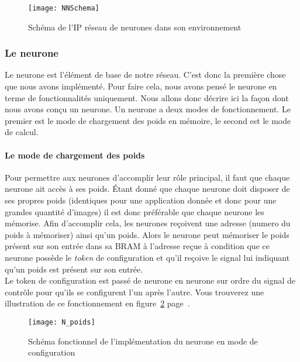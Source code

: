 \begin{figure}[h!]
	\begin{center}
		\texttt{[image: NNSchema]}
		\label{fig:NNSchema}
		\caption{Schéma de l'IP réseau de neurones dans son environnement }
	\end{center}
\end{figure}

\subsubsection{Le neurone}
	Le neurone est l'élément de base de notre réseau.
	C'est donc la première chose que nous avons implémenté.
	Pour faire cela, nous avons pensé le neurone en terme de
	fonctionnalités uniquement.
	Nous allons donc décrire ici la façon dont nous avons conçu un neurone.
	Un neurone a deux modes de fonctionnement.
	Le premier est le mode de chargement des poids en mémoire, le second
	est le mode de calcul.

	\paragraph{Le mode de chargement des poids\\}

	Pour permettre aux neurones d'accomplir leur rôle principal, il faut que chaque neurone ait
	accès à ses poids. \'{E}tant donné que chaque neurone doit disposer de ses propres poids
	(identiques pour une application donnée et donc pour une grandes quantité d'images)
	il est donc préférable que chaque neurone les mémorise. Afin d'accomplir cela,
	les neurones reçoivent une adresse (numero du poids à mémoriser) ainsi qu'un poids.
	Alors le neurone peut mémoriser le poids présent sur son entrée dans
	sa BRAM à l'adresse reçue à condition que ce neurone possède le {\em token} de
	configuration et qu'il reçoive le signal lui indiquant qu'un poids est présent sur son entrée.\\
	Le token de configuration est passé de neurone en neurone
	sur ordre du signal de contrôle pour qu'ils se configurent l'un après l'autre.
	Vous trouverez une illustration de ce fonctionnement en
	figure~\ref{fig:N_poids} page~\pageref{fig:N_poids}.
	\begin{figure}[h!]
		\begin{center}
			\texttt{[image: N\_poids]}
			\caption{Schéma fonctionnel de l'implémentation du neurone en mode de configuration}
			\label{fig:N_poids}
		\end{center}
	\end{figure}


